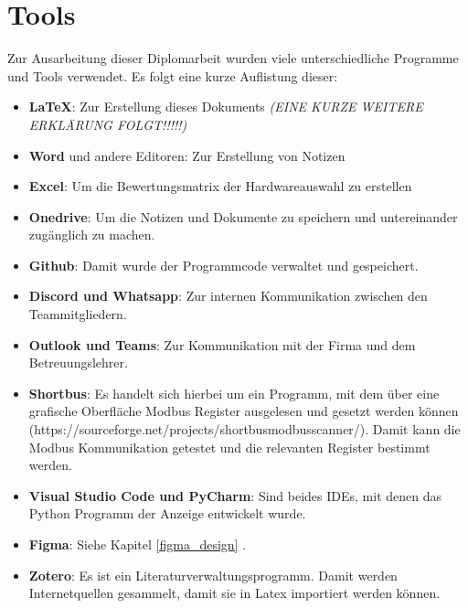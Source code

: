 \ifoot{\leftmark}
\chapter{Tools}
Zur Ausarbeitung dieser Diplomarbeit wurden viele unterschiedliche Programme und Tools verwendet. Es folgt eine kurze Auflistung dieser:
\begin{itemize}
	\item \textbf{\LaTeX}: Zur Erstellung dieses Dokuments \textit{(EINE KURZE WEITERE ERKLÄRUNG FOLGT!!!!!)}
	\item \textbf{Word} und andere Editoren: Zur Erstellung von Notizen
	\item \textbf{Excel}: Um die Bewertungsmatrix der Hardwareauswahl zu erstellen
	\item \textbf{Onedrive}: Um die Notizen und Dokumente zu speichern und untereinander zugänglich zu machen.
	\item \textbf{Github}: Damit wurde der Programmcode verwaltet und gespeichert.
	\item \textbf{Discord und Whatsapp}: Zur internen Kommunikation zwischen den Teammitgliedern.
	\item \textbf{Outlook und Teams}: Zur Kommunikation mit der Firma und dem Betreuungslehrer.
	\item \textbf{Shortbus}: Es handelt sich hierbei um ein Programm, mit dem über eine grafische Oberfläche Modbus Register ausgelesen und gesetzt werden können (https://sourceforge.net/projects/shortbusmodbusscanner/). Damit kann die Modbus Kommunikation getestet und die relevanten Register bestimmt werden.
	\item \textbf{Visual Studio Code und PyCharm}: Sind beides IDEs, mit denen das Python Programm der Anzeige entwickelt wurde.
	\item \textbf{Figma}: Siehe Kapitel \ref{figma_design} .
	\item \textbf{Zotero}: Es ist ein Literaturverwaltungsprogramm. Damit werden Internetquellen gesammelt, damit sie in Latex importiert werden können.
\end{itemize}
